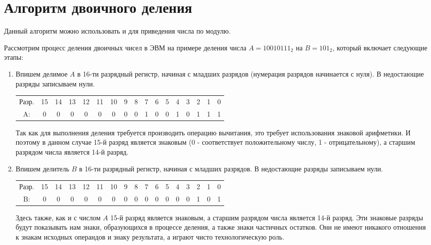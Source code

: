 \documentclass[12pt,a4paper]{scrartcl}
\begin{document}
	
\section{Алгоритм двоичного деления}

Данный алгоритм можно использовать и для приведения числа по модулю. 

Рассмотрим процесс деления двоичных чисел в ЭВМ на примере деления числа $A=10010111_2$ на $B=101_2$, который включает следующие этапы:

\begin{enumerate}
	
	\item Впишем делимое $A$ в 16-ти разрядный регистр, начиная с младших разрядов (нумерация разрядов начинается с нуля). В недостающие разряды записываем нули.
	
	\begin{table}[H]
		\centering
		\begin{tabular}{ccccccccccccccccc}
			Разр. & 15 & 14 & 13 & 12 & 11 & 10 & 9 & 8 & 7 & 6 & 5 & 4 & 3 & 2 & 1 & 0 \\
			A:    & 0  & 0  & 0  & 0  & 0  & 0  & 0 & 0 & 1 & 0 & 0 & 1 & 0 & 1 & 1 & 1
		\end{tabular}
	\end{table}
	
	Так как для выполнения деления требуется производить операцию вычитания, это требует использования знаковой арифметики. И поэтому в данном случае 15-й разряд является знаковым (0 - соответствует положительному числу, 1 - отрицательному), а старшим разрядом числа является 14-й разряд.
	
	\item Впишем делитель $B$ в 16-ти разрядный регистр, начиная с младших разрядов. В недостающие разряды записываем нули.
	
	\begin{table}[H]
		\centering
		\begin{tabular}{ccccccccccccccccc}
			Разр. & 15 & 14 & 13 & 12 & 11 & 10 & 9 & 8 & 7 & 6 & 5 & 4 & 3 & 2 & 1 & 0 \\
			B:    & 0  & 0  & 0  & 0  & 0  & 0  & 0 & 0 & 0 & 0 & 0 & 0 & 0 & 1 & 0 & 1
		\end{tabular}
	\end{table}
	
	Здесь также, как и с числом $A$ 15-й разряд является знаковым, а старшим разрядом числа является 14-й разряд. Эти знаковые разряды будут показывать нам знаки, образующихся в процессе деления, а также знаки частичных остатков. Они не имеют никакого отношения к знакам исходных операндов и знаку результата, а играют чисто технологическую роль.
	

\end{enumerate}
\end{document}
